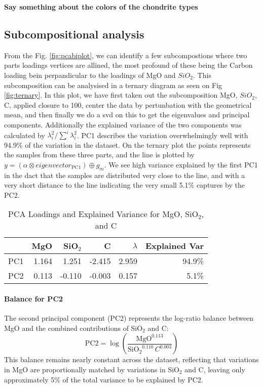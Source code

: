 \textbf{Say something about the colors of the chondrite types}



\subsection{Subcompositional analysis }

From the Fig. \ref{fig:pcabiplot}, we can identify a few subcompostions where two parts loadings vertices 
are allined, the most profound of these being the Carbon loading bein perpandicular to the loadings of MgO and $SiO_2$. This subcomposition can be analysised in a ternary diagram as seen on Fig \ref{fig:ternary}. In this plot, we have first taken out the subcomposition MgO, $SiO_2$, C, applied closure to 100, center the data by pertunbation with the geometrical mean, and then finally we do a svd on this to get the eigenvalues and principal components. Additionally the explained variance of the two components was calculated by $\lambda_{i}^{2} / \sum^{i} \lambda_{i}^{2}$. PC1 describes the variation overwhelmingly well with 94.9\% of the variation in the dataset. On the ternary plot the points represents the samples from these three parts, and the line is plotted by $y = (\alpha \otimes eigenvector_{\mathrm{PC1}}) \oplus g_m$. We see high variance explained by the first PC1 in the dact that the samples are distributed very close to the line, and with a very short distance to the line indicating the very small 5.1\% captures by the PC2. 

\begin{table}[!ht]
\centering
\begin{tabular}{lrrrrr}
\hline
      & MgO      & SiO$_2$   & C         & $\lambda$   & Explained Var \\
\hline
PC1   & 1.164    & 1.251     & -2.415    & 2.959       & 94.9\% \\
PC2   & 0.113    & -0.110    & -0.003    & 0.157       & 5.1\% \\
\hline
\end{tabular}
\caption{PCA Loadings and Explained Variance for MgO, SiO$_2$, and C}
\label{tab:pca_loadings}
\end{table}

\paragraph{Balance for PC2}  
The second principal component (PC2) represents the log-ratio balance between MgO and the combined contributions of SiO$_2$ and C:
\[
\mathrm{PC2} = \log\left( \frac{\mathrm{MgO}^{0.113}}{\mathrm{SiO_2}^{0.110} \, C^{0.003}} \right)
\]
This balance remains nearly constant across the dataset, reflecting that variations in MgO are proportionally matched by variations in SiO$_2$ and C, leaving only approximately 5\% of the total variance to be explained by PC2. 


